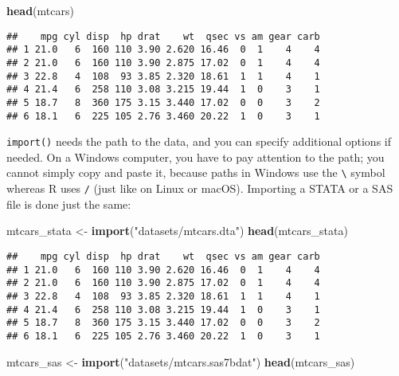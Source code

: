 \documentclass[
]{article}
\newenvironment{Shaded}{\begin{snugshade}}{\end{snugshade}}
\newcommand{\KeywordTok}[1]{\textcolor[rgb]{0.13,0.29,0.53}{\textbf{#1}}}
\newcommand{\NormalTok}[1]{#1}
\newcommand{\StringTok}[1]{\textcolor[rgb]{0.31,0.60,0.02}{#1}}
\begin{document}
\begin{Shaded}
\begin{Highlighting}[]
\KeywordTok{head}\NormalTok{(mtcars)}
\end{Highlighting}
\end{Shaded}

\begin{verbatim}
##    mpg cyl disp  hp drat    wt  qsec vs am gear carb
## 1 21.0   6  160 110 3.90 2.620 16.46  0  1    4    4
## 2 21.0   6  160 110 3.90 2.875 17.02  0  1    4    4
## 3 22.8   4  108  93 3.85 2.320 18.61  1  1    4    1
## 4 21.4   6  258 110 3.08 3.215 19.44  1  0    3    1
## 5 18.7   8  360 175 3.15 3.440 17.02  0  0    3    2
## 6 18.1   6  225 105 2.76 3.460 20.22  1  0    3    1
\end{verbatim}

\texttt{import()} needs the path to the data, and you can specify additional options if needed. On a
Windows computer, you have to pay attention to the path; you cannot simply copy and paste it, because
paths in Windows use the \texttt{\textbackslash{}} symbol whereas R uses \texttt{/} (just like on Linux or macOS).
Importing a STATA or a SAS file is done just the same:

\begin{Shaded}
\begin{Highlighting}[]
\NormalTok{mtcars\_stata \textless{}{-}}\StringTok{ }\KeywordTok{import}\NormalTok{(}\StringTok{"datasets/mtcars.dta"}\NormalTok{)}
\KeywordTok{head}\NormalTok{(mtcars\_stata)}
\end{Highlighting}
\end{Shaded}

\begin{verbatim}
##    mpg cyl disp  hp drat    wt  qsec vs am gear carb
## 1 21.0   6  160 110 3.90 2.620 16.46  0  1    4    4
## 2 21.0   6  160 110 3.90 2.875 17.02  0  1    4    4
## 3 22.8   4  108  93 3.85 2.320 18.61  1  1    4    1
## 4 21.4   6  258 110 3.08 3.215 19.44  1  0    3    1
## 5 18.7   8  360 175 3.15 3.440 17.02  0  0    3    2
## 6 18.1   6  225 105 2.76 3.460 20.22  1  0    3    1
\end{verbatim}

\begin{Shaded}
\begin{Highlighting}[]
\NormalTok{mtcars\_sas \textless{}{-}}\StringTok{ }\KeywordTok{import}\NormalTok{(}\StringTok{"datasets/mtcars.sas7bdat"}\NormalTok{)}
\KeywordTok{head}\NormalTok{(mtcars\_sas)}
\end{Highlighting}
\end{Shaded}
\end{document}
